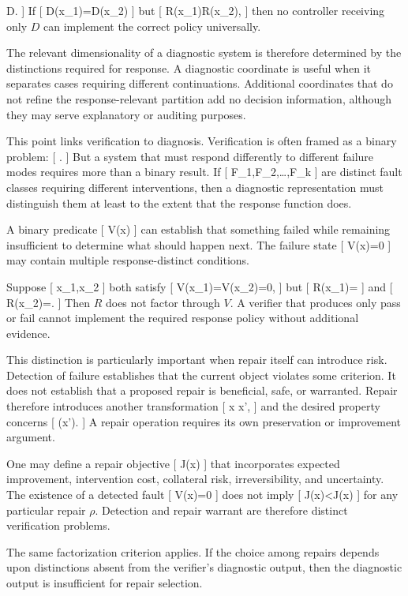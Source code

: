 \documentclass[11pt]{article}
\begin{document}
\circ D.
]
If
[
D(x_1)=D(x_2)
]
but
[
R(x_1)\neq R(x_2),
]
then no controller receiving only $D$ can implement the correct policy universally.

The relevant dimensionality of a diagnostic system is therefore determined by the distinctions required for response. A diagnostic coordinate is useful when it separates cases requiring different continuations. Additional coordinates that do not refine the response-relevant partition add no decision information, although they may serve explanatory or auditing purposes.

This point links verification to diagnosis. Verification is often framed as a binary problem:
[
\quad{}\quad
{}.
]
But a system that must respond differently to different failure modes requires more than a binary result. If
[
F_1,F_2,\ldots,F_k
]
are distinct fault classes requiring different interventions, then a diagnostic representation must distinguish them at least to the extent that the response function does.

A binary predicate
[
V(x)
]
can establish that something failed while remaining insufficient to determine what should happen next. The failure state
[
V(x)=0
]
may contain multiple response-distinct conditions.

Suppose
[
x_1,x_2
]
both satisfy
[
V(x_1)=V(x_2)=0,
]
but
[
R(x_1)=
]
and
[
R(x_2)=.
]
Then $R$ does not factor through $V$. A verifier that produces only pass or fail cannot implement the required response policy without additional evidence.

This distinction is particularly important when repair itself can introduce risk. Detection of failure establishes that the current object violates some criterion. It does not establish that a proposed repair is beneficial, safe, or warranted. Repair therefore introduces another transformation
[
x
\xrightarrow{\rho}
x',
]
and the desired property concerns
[
\Phi(x').
]
A repair operation requires its own preservation or improvement argument.

One may define a repair objective
[
J(\rho\mid x)
]
that incorporates expected improvement, intervention cost, collateral risk, irreversibility, and uncertainty. The existence of a detected fault
[
V(x)=0
]
does not imply
[
J(\rho\mid x)<J(\varnothing\mid x)
]
for any particular repair $\rho$. Detection and repair warrant are therefore distinct verification problems.

The same factorization criterion applies. If the choice among repairs depends upon distinctions absent from the verifier's diagnostic output, then the diagnostic output is insufficient for repair selection.
\end{document}
